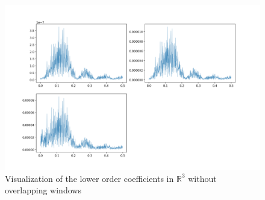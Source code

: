 \documentclass[final]{article}
\begin{document}
\begin{figure}[H]
  \centering
  \includegraphics[width=\linewidth]{img/fourier3}
  \caption{Visualization of the lower order coefficients in $\mathbb{R}^3$
  without overlapping windows}
  \label{fig:coeff}
\end{figure}
\end{document}
